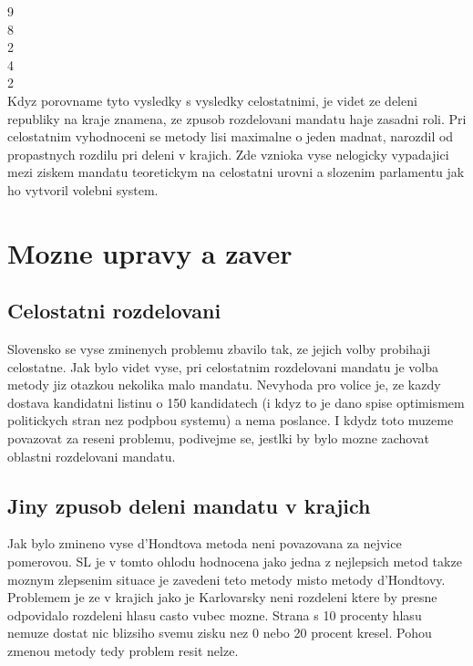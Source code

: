\documentclass[12pt,a4paper]{report}
\begin{document}
9\\
8\\
2\\
4\\
2\\

Kdyz porovname tyto vysledky s vysledky celostatnimi, je videt ze deleni republiky na kraje znamena, ze zpusob rozdelovani mandatu haje zasadni roli.
Pri celostatnim vyhodnoceni se metody lisi maximalne o jeden madnat, narozdil od propastnych rozdilu pri deleni v krajich.
Zde vznioka vyse nelogicky vypadajici mezi ziskem mandatu teoretickym na celostatni urovni a slozenim parlamentu jak ho vytvoril volebni system.

\chapter{Mozne upravy a zaver}

\section{Celostatni rozdelovani}
Slovensko se vyse zminenych problemu zbavilo tak, ze jejich volby probihaji celostatne.
Jak bylo videt vyse, pri celostatnim rozdelovani mandatu je volba metody jiz otazkou nekolika malo mandatu.
Nevyhoda pro volice je, ze kazdy dostava kandidatni listinu o 150 kandidatech (i kdyz to je dano spise optimismem politickych stran nez podpbou systemu) a nema  poslance.
I kdydz toto muzeme povazovat za reseni problemu, podivejme se, jestlki by bylo mozne zachovat oblastni rozdelovani mandatu.
\section{Jiny zpusob deleni mandatu v krajich}
Jak bylo zmineno vyse  %
d'Hondtova metoda neni povazovana za nejvice pomerovou.
SL je v tomto ohlodu hodnocena jako jedna z nejlepsich metod %
takze moznym zlepsenim situace je zavedeni teto metody misto metody d'Hondtovy.
Problemem je ze v krajich jako je Karlovarsky neni rozdeleni ktere by presne odpovidalo rozdeleni hlasu casto vubec mozne.
Strana s 10 procenty hlasu nemuze dostat nic blizsiho svemu zisku nez 0 nebo 20 procent kresel.
Pohou zmenou metody tedy problem resit nelze. 
\end{document}
